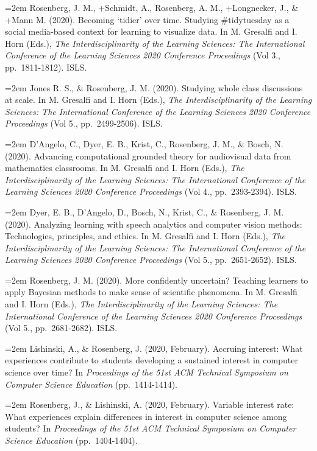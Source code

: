 \documentclass[
  14,
]{article}
\begin{document}
\hangindent=2em Rosenberg, J. M., +Schmidt, A., Rosenberg, A. M.,
+Longnecker, J., \& +Mann M. (2020). Becoming `tidier' over time.
Studying \#tidytuesday as a social media-based context for learning to
visualize data. In M. Gresalfi and I. Horn (Eds.), \emph{The
Interdisciplinarity of the Learning Sciences: The International
Conference of the Learning Sciences 2020 Conference Proceedings} (Vol
3., pp.~1811-1812). ISLS.

\hangindent=2em Jones R. S., \& Rosenberg, J. M. (2020). Studying whole
class discussions at scale. In M. Gresalfi and I. Horn (Eds.), \emph{The
Interdisciplinarity of the Learning Sciences: The International
Conference of the Learning Sciences 2020 Conference Proceedings} (Vol
5., pp.~2499-2506). ISLS.

\hangindent=2em D'Angelo, C., Dyer, E. B., Krist, C., Rosenberg, J. M.,
\& Bosch, N. (2020). Advancing computational grounded theory for
audiovisual data from mathematics classrooms. In M. Gresalfi and I. Horn
(Eds.), \emph{The Interdisciplinarity of the Learning Sciences: The
International Conference of the Learning Sciences 2020 Conference
Proceedings} (Vol 4., pp.~2393-2394). ISLS.

\hangindent=2em Dyer, E. B., D'Angelo, D., Bosch, N., Krist, C., \&
Rosenberg, J. M. (2020). Analyzing learning with speech analytics and
computer vision methods: Technologies, principles, and ethics. In M.
Gresalfi and I. Horn (Eds.), \emph{The Interdisciplinarity of the
Learning Sciences: The International Conference of the Learning Sciences
2020 Conference Proceedings} (Vol 5., pp.~2651-2652). ISLS.

\hangindent=2em Rosenberg, J. M. (2020). More confidently uncertain?
Teaching learners to apply Bayesian methods to make sense of scientific
phenomena. In M. Gresalfi and I. Horn (Eds.), \emph{The
Interdisciplinarity of the Learning Sciences: The International
Conference of the Learning Sciences 2020 Conference Proceedings} (Vol
5., pp.~2681-2682). ISLS.

\hangindent=2em Lishinski, A., \& Rosenberg, J. (2020, February).
Accruing interest: What experiences contribute to students developing a
sustained interest in computer science over time? In \emph{Proceedings
of the 51st ACM Technical Symposium on Computer Science Education}
(pp.~1414-1414).

\hangindent=2em Rosenberg, J., \& Lishinski, A. (2020, February).
Variable interest rate: What experiences explain differences in interest
in computer science among students? In \emph{Proceedings of the 51st ACM
Technical Symposium on Computer Science Education} (pp.~1404-1404).
\end{document}
